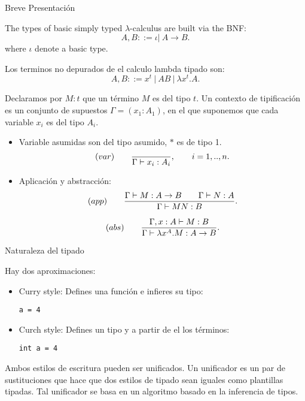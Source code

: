 \documentclass[usenames,dvipsnames]{beamer}
\begin{document}
\begin{frame}{Breve Presentación}
  \begin{definition}
    The types of basic simply typed $\lambda$-calculus are built via the BNF:
    $$A,B ::= \iota |\ A\to B .$$
    where $\iota$ denote a basic type. 
  \end{definition}
\end{frame}
\begin{frame}
  \begin{definition}
Los terminos no depurados de el calculo lambda tipado son:
    $$A,B ::= x^t\ |\ AB\ |\ \lambda x^t.A .$$
  \end{definition}

   Declaramos por $M:t$ que un término $M$ es del tipo $t$. Un contexto de tipificación es un conjunto de supuestos $\Gamma = (x_1:A_1)$, en el que suponemos que cada variable $x_i$ es del tipo $A_i$.
\end{frame}

\begin{frame}

  \begin{definition}\label{def:typing-rules}
    \begin{itemize}
    \item  Variable asumidas son del tipo asumido, $*$ es de tipo 1.
      $$  (var)\qquad  {\displaystyle \over \Gamma \vdash x_i:A_i},\qquad  i=  1,..,n.$$

    \item Aplicación y abstracción:
      $$(app)\qquad  {\displaystyle \Gamma \vdash M:A\to B\qquad \Gamma \vdash N:A      \over \Gamma \vdash MN:B}.$$

      $$(abs)\qquad  {\displaystyle \Gamma, x: A\vdash M: B  \over \Gamma \vdash \lambda x^A.M:A\to B}.$$
    \end{itemize}
  \end{definition}
\end{frame}


\begin{frame}{Naturaleza del tipado}

  Hay dos aproximaciones:
  \begin{itemize}
  \item Curry style: Defines una función e infieres su tipo:
    \begin{center}
      \texttt{a = 4}
    \end{center}
  \item Curch style: Defines un tipo y a partir de el los términos:
    \begin{center}
      \texttt{int a = 4}
    \end{center}
  \end{itemize}
Ambos estilos de escritura pueden ser unificados. Un unificador es un par de sustituciones que hace que dos estilos de tipado sean iguales como plantillas tipadas. Tal unificador se basa en un algoritmo basado en la inferencia de tipos.
\end{frame}
\end{document}
